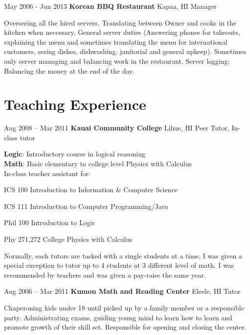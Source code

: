 \documentclass{tccv}
\begin{document}
\begin{eventlist}
		
		\item {May 2006 - Jun 2013}
			{\textbf{Korean BBQ Restaurant}	Kapaa, HI}
			{Manager}
			
			Overseeing all the hired servers.
			Translating between Owner and cooks in the kitchen when neccesary.
			General server duties 
			(Answering phones for takeouts,
			explaining the menu and sometimes translating the menu for international customers,
			sering dishes,
			dishwashing,
			janitorial and general upkeep).
			Sometimes only server managing and balancing work in the restaurant. 
			Server logging: Balancing the money at the end of the day.

	\end{eventlist}

\section{Teaching Experience}
	 \begin{eventlist}
		 \item {Aug 2008 -- Mar 2011}
			 {\textbf{Kauai Community College}           Lihue, HI}
			 {Peer Tutor, In-class tutor}

			\textbf{Logic}: Introductory course in logical reasoning \\
			\textbf{Math}: Basic elementary to college level Physics with Calculus \\
			In-class teacher assistant for:\\
			 \begin{factlist}
				 \item{ICS 100}
					 {Introduction to Information \& Computer Science}
				 \item{ICS 111}
					 {Introduction to Computer Programming/Java}
				 \item{Phil 100}
					 {Introduction to Logic}
				 \item{Phy 271,272}
					 {College Physics with Calculus}
			 \end{factlist}
			 Normally, each tutors are tasked with a single students at a time, I was given a special exception to tutor up to 4 students at 3 different level of math. I was recommended by teachers and was given a pay-raise the same year. 


		\item {Aug 2006 -- Mar 2011}
			{\textbf{Kumon Math and Reading Center}       Eleele, HI}
			{Tutor}

			Chaperoning kids under 18 until picked up by a family member or a responsible party.
			Administrating exams, guiding young mind to learn how to learn and promote growth of their skill set. 
			Responsible for opening and closing the center. 
				
	\end{eventlist}


		
		
\end{document}
